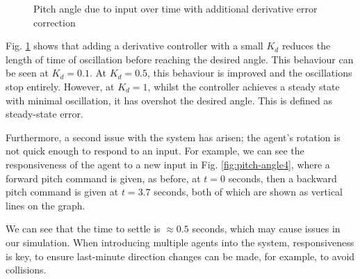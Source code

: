 \documentclass[12pt]{article}
\begin{document}
\begin{figure}[ht]
\begin{subfigure}{.4\textwidth}
    \end{subfigure}
    \caption{Pitch angle due to input over time with additional derivative error correction}
    \label{fig:pitch-angle3}
\end{figure}

Fig. \ref{fig:pitch-angle3} shows that adding a derivative controller with a small $K_d$ reduces the length of time of oscillation before reaching the desired angle. This behaviour can be seen at $K_d = 0.1$. At $K_d = 0.5$, this behaviour is improved and the oscillations stop entirely. However, at $K_d = 1$, whilst the controller achieves a steady state with minimal oscillation, it has overshot the desired angle. This is defined as steady-state error.

Furthermore, a second issue with the system has arisen; the agent's rotation is not quick enough to respond to an input. For example, we can see the responsiveness of the agent to a new input in Fig. \ref{fig:pitch-angle4}, where a forward pitch command is given, as before, at $t = 0$ seconds, then a backward pitch command is given at $t = 3.7$ seconds, both of which are shown as vertical lines on the graph.

We can see that the time to settle is $\approx 0.5$ seconds, which may cause issues in our simulation. When introducing multiple agents into the system, responsiveness is key, to ensure last-minute direction changes can be made, for example, to avoid collisions.
\end{document}
